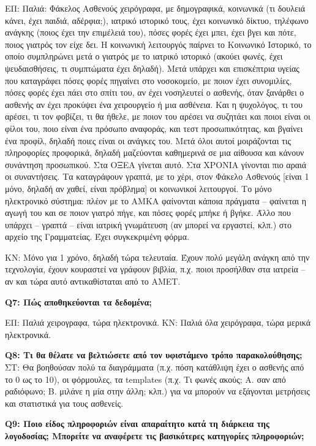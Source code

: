 ΕΠ: Παλιά: Φάκελος Ασθενούς χειρόγραφα, με δημογραφικά, κοινωνικά (τι δουλειά κάνει, έχει παιδιά, αδέρφια;), ιατρικό ιστορικό τους, έχει κοινωνικό δίκτυο, τηλέφωνο ανάγκης (ποιος έχει την επιμέλειά του), πόσες φορές έχει μπει, έχει βγει και πότε, ποιος γιατρός τον είχε δει.
Η κοινωνική λειτουργός παίρνει το Κοινωνικό Ιστορικό, το οποίο συμπληρώνει μετά ο γιατρός με το ιατρικό ιστορικό (ακούει φωνές, έχει ψευδαισθήσεις, τι συμπτώματα έχει δηλαδή). Μετά υπάρχει και επισκέπτρια υγείας που καταγράφει πόσες φορές πηγαίνει στο νοσοκομείο, με ποιον έχει συνομιλίες, πόσες φορές έχει πάει στο σπίτι του, αν έχει νοσηλευτεί ο ασθενής, όταν ξανάρθει ο ασθενής αν έχει προκύψει ένα χειρουργείο ή μια ασθένεια. Και η ψυχολόγος, τι του αρέσει, τι τον φοβίζει, τι θα ήθελε, με ποιον του αρέσει να συζητάει και ποιοι είναι οι φίλοι του, ποιο είναι ένα πρόσωπο αναφοράς, και τεστ προσωπικότητας, και βγαίνει ένα προφίλ, δηλαδή ποιες είναι οι ανάγκες του.
Μετά όλοι αυτοί μοιράζονται τις πληροφορίες προφορικά, δηλαδή μαζεύονται καθημερινά σε μια αίθουσα και κάνουν συνάντηση προσωπικού. Στα ΟΞΕΑ γίνεται αυτό. Στα ΧΡΟΝΙΑ γίνονται πιο αραιά οι συναντήσεις. Τα καταγράφουν γραπτά, με το χέρι, στον Φάκελο Ασθενούς [είναι 1 μόνο, δηλαδή αν χαθεί, είναι πρόβλημα] οι κοινωνικοί λειτουργοί.
Το μόνο ηλεκτρονικό σύστημα: πλέον με το ΑΜΚΑ φαίνονται κάποια πράγματα – φαίνεται η αγωγή του και σε ποιον γιατρό πήγε, και πόσες φορές μπήκε ή βγήκε.
Άλλο που υπάρχει – γραπτά – είναι ιατρική γνωμάτευση (αν μπορεί να εργαστεί, κλπ.) στο αρχείο της Γραμματείας. Έχει συγκεκριμένη φόρμα.

KN: Μόνο για 1 χρόνο, δηλαδή τώρα τελευταία. Έχουν πολύ μεγάλη ανάγκη από την τεχνολογία, έχουν κουραστεί να γράφουν βιβλία, π.χ. ποιοι προσήλθαν στα ιατρεία – αν και τώρα αυτό αντικαθίσταται από το ΑΜΕΤ.


\textbf{Q7:	Πώς αποθηκεύονται τα δεδομένα;} 

EΠ: Παλιά χειρογραφα, τώρα ηλεκτρονικά.
ΚΝ: Παλιά όλα χειρόγραφα, τώρα μερικά ηλεκτρονικά.

\textbf{Q8:	Τι θα θέλατε να βελτιώσετε από τον υφιστάμενο τρόπο παρακολούθησης;}
ΣΤ: Θα βοηθούσαν πολύ τα διαγράμματα (π.χ. πόση κατάθλιψη έχει ο ασθενής από το 0 ως το 10), οι φόρμουλες, τα templates (π.χ. Τι φωνές ακούς; Α. σαν από ραδιόφωνο; Β. μιλάνε η μία στην άλλη; κλπ.) για να μπορούν να εξάγονται μετρήσεις και στατιστικά για τους ασθενείς.

\textbf{Q9:	Ποιο είδος πληροφοριών είναι απαραίτητο κατά τη διάρκεια της λογοδοσίας; Μπορείτε να αναφέρετε τις βασικότερες κατηγορίες πληροφοριών;}

